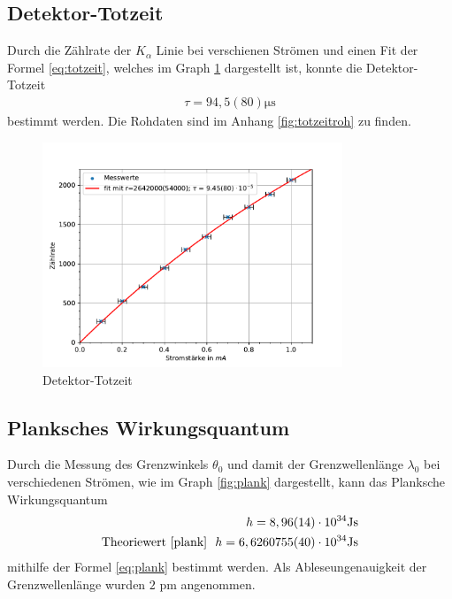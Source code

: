 \documentclass[11pt, a4paper]{article}
\begin{document}
    \subsection{Detektor-Totzeit}
    Durch die Zählrate der $K_{\alpha}$ Linie bei verschienen Strömen und einen Fit der Formel \ref{eq:totzeit}, welches im Graph \ref{fig:totzeit} dargestellt ist, konnte die Detektor-Totzeit
    \begin{align}
        \tau = 94,5(80) \si{\micro\second}
    \end{align}
    bestimmt werden. Die Rohdaten sind im Anhang \ref{fig:totzeitroh} zu finden.

    \begin{figure}
        \centering
        \includegraphics[width=0.8\textwidth]{Detektortotzeit.pdf}
        \caption{Detektor-Totzeit}
        \label{fig:totzeit}
    \end{figure}

    \subsection{Planksches Wirkungsquantum}

    Durch die Messung des Grenzwinkels $\theta_0$ und damit der Grenzwellenlänge $\lambda_0$ bei verschiedenen Strömen, wie im Graph \ref{fig:plank} dargestellt, kann das Planksche Wirkungsquantum
    \begin{align}
        h = 8,96(14) \cdot 10^{34} \text{Js} \\
        \text{Theoriewert \cite{plank}} \ \  h = 6,6260755(40) \cdot 10^{34} \text{Js}
    \end{align}
    mithilfe der Formel \ref{eq:plank} bestimmt werden. Als Ableseungenauigkeit der Grenzwellenlänge wurden $2$ pm angenommen.
\end{document}
